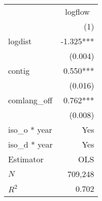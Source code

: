 \begin{tabular}{lr}
\toprule
             & \multicolumn{1}{c}{logflow} \\ 
\cmidrule(lr){2-2} 
             &                         (1) \\ 
\midrule
logdist      &                   -1.325*** \\ 
             &                     (0.004) \\ 
contig       &                    0.550*** \\ 
             &                     (0.016) \\ 
comlang_off  &                    0.762*** \\ 
             &                     (0.008) \\ 
\midrule
iso_o * year &                         Yes \\ 
iso_d * year &                         Yes \\ 
\midrule
Estimator    &                         OLS \\ 
\midrule
$N$          &                     709,248 \\ 
$R^2$        &                       0.702 \\ 
\bottomrule
\end{tabular}

